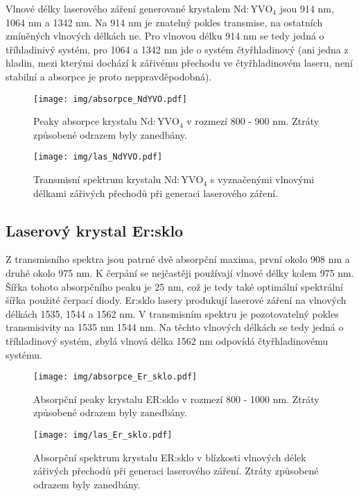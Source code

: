 	Vlnové délky laserového záření generované krystalem $\mathrm{Nd:YVO_4}$ jsou 914 nm, 1064 nm a 1342 nm. Na 914 nm je znatelný pokles transmise, na ostatních zmíněných vlnových délkách ne. Pro vlnovou délku 914 nm se tedy jedná o tříhladinivý systém, pro 1064 a 1342 nm jde o systém čtyřhladinový (ani jedna z hladin, mezi kterými dochází k zářivému přechodu ve čtyřhladinovém laseru, není stabilní a absorpce je proto neppravděpodobná).
	\begin{figure}[!hbt]
  \centering
    \texttt{[image: img/absorpce\_NdYVO.pdf]} 
    \caption{Peaky absorpce krystalu $\mathrm{Nd:YVO_4}$ v rozmezí 800 - 900 nm. Ztráty způsobené odrazem byly zanedbány.}
    \label{fig:absorpce_NdYVO} %
\end{figure} 

\begin{figure}[!hbt]
  \centering
    \texttt{[image: img/las\_NdYVO.pdf]} 
    \caption{Transmisní spektrum krystalu $\mathrm{Nd:YVO_4}$ s vyznačenými vlnovými délkami zářivých přechodů při generaci laserového záření.}
    \label{fig:absorpce_NdYVO} %
\end{figure} 
	
	
	\subsection{Laserový krystal Er:sklo}
	Z transmisního spektra jsou patrné dvě absorpční maxima, první okolo 908 nm a druhé okolo 975 nm. K čerpání se nejčastěji používají vlnové délky kolem 975 nm. Šířka tohoto absorpčního peaku je 25 nm, což je tedy také optimální spektrální šířka použité čerpací diody. 
	Er:sklo lasery produkují laserové záření na vlnových délkách 1535, 1544 a 1562 nm. V transmisním spektru je pozotovatelný pokles transmisivity na 1535 nm  1544 nm. Na těchto vlnových délkách se tedy jedná o tříhladinový systém, zbylá vlnová délka 1562 nm odpovídá čtyřhladinovému systému.
	
\begin{figure}[!hbt]
  \centering
    \texttt{[image: img/absorpce\_Er\_sklo.pdf]} 
    \caption{Absorpční peaky krystalu ER:sklo v rozmezí 800 - 1000 nm. Ztráty způsobené odrazem byly zanedbány.}
    \label{fig:absorpce_Ersklo} %
\end{figure} 

\begin{figure}[!hbt]
  \centering
    \texttt{[image: img/las\_Er\_sklo.pdf]} 
    \caption{Absorpční spektrum krystalu ER:sklo v blízkosti vlnových délek zářivých přechodů při generaci laserového záření. Ztráty způsobené odrazem byly zanedbány.}
    \label{fig:las_Ersklo} %
\end{figure} 
\newpage

